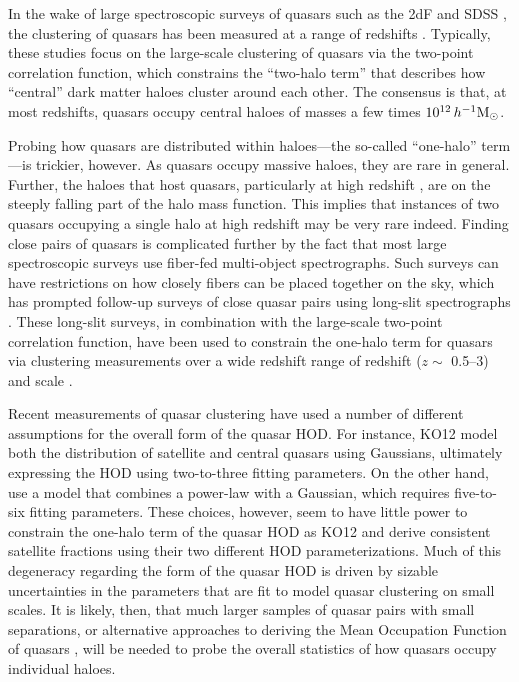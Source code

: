\documentclass[useAMS,usenatbib]{mn2e}
\begin{document}
In the wake of large spectroscopic surveys of quasars such as the 2dF \citep[][]{2dFsurv} and SDSS 
\citep[e.g.,][]{fu96,gu98,yo00,va01,st02,str02,te04,we04,yi04a,yi04b,bo04,ro05,wi05}, the clustering of quasars has been measured at a range of redshifts
\citep[e.g.,][]{cr04,po04,my06,my07,my07b,she07,she09a,ro09,ric12,wh12,ric13,ro13,ef15,la17}.
Typically, these studies focus on the large-scale clustering of quasars via the two-point correlation function, which 
constrains the ``two-halo term'' that describes how ``central'' dark matter haloes cluster around each other. The consensus is that, 
at most redshifts, quasars occupy central haloes of masses a few times $10^{12}\,h^{-1} {\rm M_{\odot}}$. 

Probing how quasars are distributed within haloes---the so-called ``one-halo'' term---is trickier, however. As 
quasars occupy massive haloes, they are rare in general. Further, the haloes that host quasars, particularly at 
high redshift \citep[e.g.,][]{wh12,ef15}, are on the steeply falling part of the halo mass function.%
This implies that instances of two quasars occupying a single halo at high redshift may be very rare indeed. 
Finding close pairs of quasars is complicated further by the fact that most large spectroscopic surveys use 
fiber-fed multi-object spectrographs. Such surveys can have restrictions on how closely fibers can be placed 
together on the sky, which has prompted follow-up surveys of close quasar pairs using long-slit spectrographs 
\citep[e.g.,][]{Hen06,my08,Hen10,ko12,ef17}. These long-slit surveys, in combination with the large-scale two-point
correlation function, have been used to constrain the one-halo term for quasars via clustering measurements over 
a wide redshift range of redshift ($z \sim$ 0.5--3) and scale \citep[][]{ric12,ko12,sh13}.

Recent measurements of quasar clustering have used a number of different assumptions for the overall form
of the quasar HOD. For instance, KO12 model both the distribution of satellite and
central quasars using Gaussians, ultimately expressing the HOD using two-to-three fitting  
parameters. On the other hand, \citet{zh07,ric12,ric13,sh13} use a model that combines a power-law with
a Gaussian, which requires five-to-six fitting parameters. These choices, however, seem to have little
power to constrain the one-halo term of the quasar HOD as KO12 and \citep{sh13} derive consistent 
satellite fractions using their two different HOD parameterizations. Much of this degeneracy regarding the form of the quasar 
HOD is driven by sizable uncertainties in the parameters that are fit to model quasar clustering on small scales. It is likely, 
then, that much larger samples of quasar pairs with small separations, or alternative approaches to deriving the 
Mean Occupation Function of quasars \citep[e.g][]{Cha13}, will be needed to probe the overall statistics of how
quasars occupy individual haloes.
\end{document}
